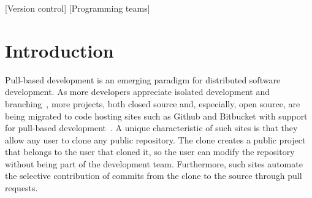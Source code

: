 \documentclass{sig-alternate}
\begin{document}
[Version control]
[Programming teams]



\section{Introduction}

%

Pull-based development is an emerging paradigm for distributed software
development. As more developers appreciate isolated
development and branching~\cite{Bird12}, more projects, both closed source and,
especially, open source, are being migrated to code hosting sites such as Github
and Bitbucket with support for pull-based development~\cite{Barr12}. A unique
characteristic of such sites is that they allow any user to clone any public
repository. The clone creates a public project that belongs to the user that
cloned it, so the user can modify the repository without being part of the
development team. Furthermore, such sites automate the selective
contribution of commits from the clone to the source through pull requests. 
\end{document}
